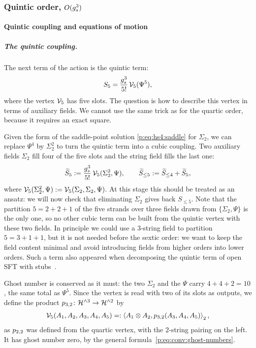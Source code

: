 \subsubsection{Quintic order, \texorpdfstring{$O(\gs^3)$}{O(gs**3)}}
\label{p:sec:hs:quintic}

\paragraph{Quintic coupling and equations of motion}

\subparagraph{The quintic coupling.}

The next term of the action is the quintic term:
\begin{equation}
  \label{p:eq:hs5:S5}
  S_5
    = \frac{\gs^3}{5!} \, \vertex{5}(\Psi^5),
\end{equation}
where the vertex $\vertex{5}$ has five slots.
The question is how to describe this vertex in terms of auxiliary fields.
We cannot use the same trick as for the quartic order, because it requires an exact square.

Given the form of the saddle-point solution \eqref{p:eq:hs4:saddle} for $\Sigma_2$, we can replace $\Psi^4$ by $\Sigma_2^2$ to turn the quintic term into a cubic coupling.
Two auxiliary fields $\Sigma_2$ fill four of the five slots and the string field fills the last one:
\begin{equation}
  \label{p:eq:hs5:S5tilde}
  \caction[5]
    := \frac{\gs^3}{5!} \, \vertex{5}(\Sigma_2^2, \Psi),
  \qquad
  \caction[\le 5]
    := \caction[\le 4] + \caction[5],
\end{equation}
where $\vertex{5}(\Sigma_2^2, \Psi) := \vertex{5}(\Sigma_2, \Sigma_2, \Psi)$.
At this stage this should be treated as an ansatz: we will now check that eliminating $\Sigma_2$ gives back $S_{\le 5}$.
Note that the partition $5 = 2 + 2 + 1$ of the five strands over three fields drawn from $\{\Sigma_2, \Psi\}$ is the only one, so no other cubic term can be built from the quintic vertex with these two fields.
In principle we could use a $3$-string field to partition $5 = 3 + 1 + 1$, but it is not needed before the sextic order: we want to keep the field content minimal and avoid introducing fields from higher orders into lower orders.
Such a term also appeared when decomposing the quintic term of open SFT with stubs~\cite{Erbin:2024:OpenStringStub}.

Ghost number is conserved as it must: the two $\Sigma_2$ and the $\Psi$ carry $4 + 4 + 2 = 10$, the same total as $\Psi^5$.
Since the vertex is read with two of its slots as outputs, we define the product $\sprod{3}{2} \colon \Hn{3} \to \Hn{2}$ by
\begin{equation}
  \label{p:eq:hs5:p32}
  \vertex{5}(A_1, A_2, A_3, A_4, A_5)
    =: \pair[2]{A_1 \otimes A_2}{\sprod{3}{2}(A_3, A_4, A_5)},
\end{equation}
as $\sprod{2}{2}$ was defined from the quartic vertex, with the $2$-string pairing on the left.
It has ghost number zero, by the general formula~\eqref{p:eq:conv:ghost-numbers}.

